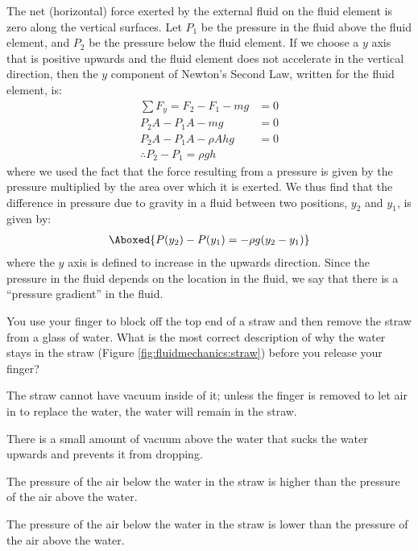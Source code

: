The net (horizontal) force exerted by the external fluid on the fluid element is zero along the vertical surfaces. Let $P_1$ be the pressure in the fluid above the fluid element, and $P_2$ be the pressure below the fluid element. If we choose a $y$ axis that is positive upwards and the fluid element does not accelerate in the vertical direction, then the $y$ component of Newton's Second Law, written for the fluid element, is:
\begin{align*}
\sum F_y = F_2 - F_1 -mg &= 0\\
P_2A - P_1A-mg &=0\\
P_2A - P_1A-\rho Ahg &=0\\
\therefore P_2 - P_1 = \rho gh
\end{align*}
where we used the fact that the force resulting from a pressure is given by the pressure multiplied by the area over which it is exerted. We thus find that the difference in pressure due to gravity in a fluid between two positions, $y_2$ and $y_1$, is given by:
\begin{align}
\label{eq:fluidmechanics:pgrav}
\Aboxed{P(y_2) - P(y_1) = -\rho g (y_2 - y_1)}
\end{align}
where the $y$ axis is defined to increase in the upwards direction. Since the pressure in the fluid depends on the location in the fluid, we say that there is a ``pressure gradient'' in the fluid.
\begin{checkpoint}
\begin{MCquestion}{You use your finger to block off the top end of a straw and then remove the straw from a glass of water. What is the most correct description of why the water stays in the straw (Figure \ref{fig:fluidmechanics:straw}) before you release your finger?}
\item The straw cannot have vacuum inside of it; unless the finger is removed to let air in to replace the water, the water will remain in the straw.
\item There is a small amount of vacuum above the water that sucks the water upwards and prevents it from dropping. 
\item The pressure of the air below the water in the straw is higher than the pressure of the air above the water. \correct
\item The pressure of the air below the water in the straw is lower than the pressure of the air above the water.
\end{MCquestion}
\end{checkpoint}


